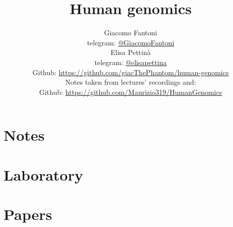 

\title{\Huge\textbf{{Human genomics}}}

\author{
  Giacomo Fantoni \\
  \small telegram: \href{https://t.me/GiacomoFantoni}{@GiacomoFantoni} \\[3pt]
  Elisa Pettin\`a \\
  \small telegram: \href{https://t.me/elisapettina}{@elisapettina} \\[3pt]
  \small Github: \href{https://github.com/giacThePhantom/human-genomics}{https://github.com/giacThePhantom/human-genomics}\\
  Notes taken from lectures' recordings and:\\
  \small Github: \href{https://github.com/Maurizio319/HumanGenomics}{https://github.com/Maurizio319/HumanGenomics}
}




  \maketitle
  \tableofcontents

  \part{Notes}
    
    
    
    
    
    
    
    
    
    

  \part{Laboratory}
    
    
    
    
    
    
    

  \part{Papers}
    
    
    
    
    
    
    


